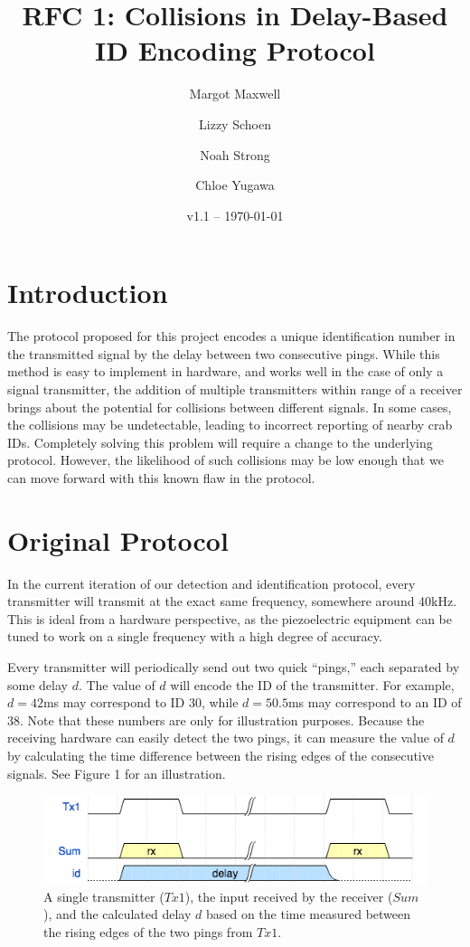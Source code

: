 \documentclass[12pt]{article}
\title{RFC 1: Collisions in Delay-Based ID Encoding Protocol}
\author{
	Margot Maxwell \and
	Lizzy Schoen \and
	Noah Strong \and
	Chloe Yugawa
}
\date{v1.1 -- \today}
\begin{document}
\maketitle

\tableofcontents{}


\section{Introduction}

The protocol proposed for this project encodes a unique identification number
in the transmitted signal by the delay between two consecutive pings.
While this method is easy to implement in hardware, and works well in the case
of only a signal transmitter, the addition of multiple transmitters within range
of a receiver brings about the potential for collisions between different
signals.
In some cases, the collisions may be undetectable, leading to incorrect
reporting of nearby crab IDs.
Completely solving this problem will require a change to the underlying
protocol.
However, the likelihood of such collisions may be low enough that we can move
forward with this known flaw in the protocol.

\section{Original Protocol}

In the current iteration of our detection and identification protocol, every
transmitter will transmit at the exact same frequency, somewhere around
40kHz. This is ideal from a hardware perspective, as the piezoelectric
equipment can be tuned to work on a single frequency with a high degree of
accuracy.

Every transmitter will periodically send out two quick ``pings,'' each separated
by some delay $d$. The value of $d$ will encode the ID of the transmitter.
For example, $d=42$ms may correspond to ID 30, while $d=50.5$ms may
correspond to an ID of 38.
Note that these numbers are only for illustration purposes.
Because the receiving hardware can easily detect the two pings, it can measure
the value of $d$ by calculating the time difference between the rising edges
of the consecutive signals. See Figure 1 for an illustration.

\begin{figure}[h]
\centering
\includegraphics[scale=0.7]{singleTx}

\caption{A single transmitter ($Tx1$), the input received by the receiver
($Sum$), and the calculated delay $d$ based on the time measured between
the rising edges of the two pings from $Tx1$.}
\end{figure}
\end{document}
